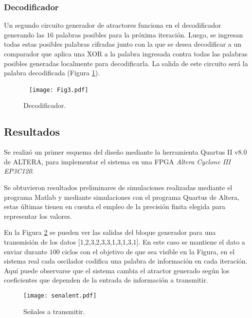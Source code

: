 \subsubsection{Decodificador}

Un segundo circuito generador de atractores funciona en el decodificador generando las $16$ palabras posibles para la próxima iteración.
Luego, se ingresan todas estas posibles palabras cifradas junto con la que se desea decodificar a un comparador que aplica una XOR a la palabra ingresada contra todas las palabras posibles generadas localmente para decodificarla.
La salida de este circuito será la palabra decodificada (Figura \ref{fig:decodificador}).
%
\begin{figure}\
    \centering
    \texttt{[image: Fig3.pdf]}\\
    \caption{Decodificador.}\label{fig:decodificador}
\end{figure}

\subsection{Resultados}

Se realizó un primer esquema del diseño mediante la herramienta Quartus II v8.0 de ALTERA, para implementar el sistema en una FPGA \emph{Altera Cyclone III EP3C120}.

Se obtuvieron resultados preliminares de simulaciones realizadas mediante el programa Matlab y mediante simulaciones con el programa Quartus de Altera, estas últimas tienen en cuenta el empleo de la precisión finita elegida para representar los valores.

En la Figura \ref{senal} se pueden ver las salidas del bloque generador para una transmisión de los datos [1,2,3,2,3,3,1,3,1,3,1].
En este caso se mantiene el dato a enviar durante $100$ ciclos con el objetivo de que sea visible en la Figura, en el sistema real cada oscilador codifica una palabra de información en cada iteración.
Aquí puede observarse que el sistema cambia el atractor generado según los coeficientes que dependen de la entrada de información a transmitir.
%
\begin{figure}
	\centering
	\texttt{[image: senalent.pdf]}\\
	\caption{Señales a transmitir.}\label{senal}
\end{figure}